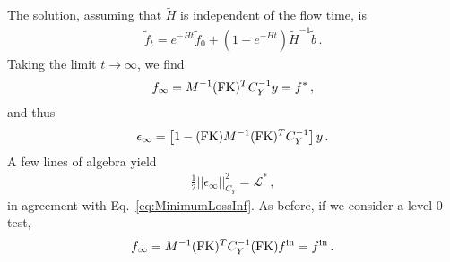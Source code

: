\documentclass[11pt]{article}
\begin{document}
\noindent
The solution, assuming that $\tilde{H}$ is independent of the flow time, is
\begin{align}
    \label{eq:FlowSolutionInFtilde}
    \tilde{f}_t = e^{-\tilde{H}t} \tilde{f}_0 + 
        \left(1 - e^{-\tilde{H}t}\right) \tilde{H}^{-1} \tilde{b}\, .
\end{align}
Taking the limit $t\to\infty$, we find
\begin{align}
    \label{eq:InfiniteTrainingF}
    f_\infty = M^{-1} (\mathrm{FK})^T C_Y^{-1} y = f^*\, ,
\end{align}
and thus
\begin{align}
    \label{eq:epsinfty}
    \epsilon_\infty = \left[
        1 - (\mathrm{FK}) M^{-1} (\mathrm{FK})^T C_Y^{-1} 
    \right] y\, .
\end{align}
A few lines of algebra yield
\begin{align}
    \frac12 ||\epsilon_\infty||_{C_Y}^2 = \mathcal{L}^*\, ,
\end{align}
in agreement with Eq.~\ref{eq:MinimumLossInf}. As before, if we consider a level-0 test, 
\begin{align}
    f_\infty = M^{-1} (\mathrm{FK})^T C_Y^{-1} (\mathrm{FK}) f^{\mathrm{in}} = f^{\mathrm{in}}\, .
\end{align}
\end{document}
